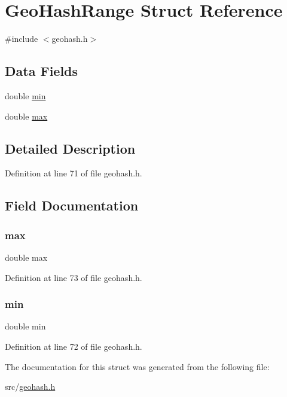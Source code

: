 \hypertarget{struct_geo_hash_range}{}\section{Geo\+Hash\+Range Struct Reference}
\label{struct_geo_hash_range}


{\ttfamily \#include $<$geohash.\+h$>$}

\subsection*{Data Fields}
\begin{DoxyCompactItemize}
\item 
double \hyperlink{struct_geo_hash_range_aad36546e8175d2922bee165fe028fedc}{min}
\item 
double \hyperlink{struct_geo_hash_range_a0b0ede69e8156eb97acc579b88e883de}{max}
\end{DoxyCompactItemize}


\subsection{Detailed Description}


Definition at line 71 of file geohash.\+h.



\subsection{Field Documentation}
\mbox{\label{struct_geo_hash_range_a0b0ede69e8156eb97acc579b88e883de}} 
\subsubsection{\texorpdfstring{max}{max}}
{\footnotesize\ttfamily double max}



Definition at line 73 of file geohash.\+h.

\mbox{\label{struct_geo_hash_range_aad36546e8175d2922bee165fe028fedc}} 
\subsubsection{\texorpdfstring{min}{min}}
{\footnotesize\ttfamily double min}



Definition at line 72 of file geohash.\+h.



The documentation for this struct was generated from the following file\+:\begin{DoxyCompactItemize}
\item 
src/\hyperlink{geohash_8h}{geohash.\+h}\end{DoxyCompactItemize}
